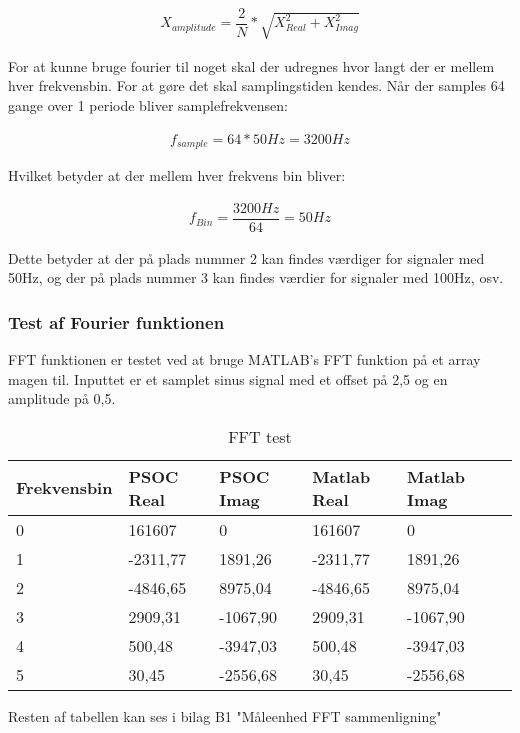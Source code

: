 \begin{align}
X_{amplitude} = \dfrac{2}{N}*\sqrt{X_{Real}^{2}+X_{Imag}^{2}}
\end{align} 	  


For at kunne bruge fourier til noget skal der udregnes hvor langt der er mellem hver frekvensbin. For at gøre det skal samplingstiden kendes. Når der samples 64 gange over 1 periode bliver samplefrekvensen:

\begin{align}
f_{sample} = 64 * 50Hz = 3200Hz
\end{align}   

Hvilket betyder at der mellem hver frekvens bin bliver:

\begin{align}
f_{Bin} = \dfrac{3200Hz}{64} = 50Hz
\end{align}

Dette betyder at der på plads nummer 2 kan findes værdiger for signaler med 50Hz, og der på plads nummer 3 kan findes værdier for signaler med 100Hz, osv.

\subsubsection{Test af Fourier funktionen}
FFT funktionen er testet ved at bruge MATLAB's FFT funktion på et array magen til. Inputtet er et samplet sinus signal med et offset på 2,5 og en amplitude på 0,5.

\begin{table}[H] 
	\centering 
	\begin{tabular}{|l|l|l|l|l|l|} %
		\hline 	%
		Frekvensbin &PSOC Real				& PSOC Imag 	&Matlab Real    	&Matlab Imag 	 \\ \hline 	
		0&161607		&0				&161607		&0 	 \\ \hline 
		1&-2311,77	&1891,26		&-2311,77	&1891,26	 \\ \hline
		2&-4846,65	&8975,04		&-4846,65	&8975,04	 \\ \hline
		3&2909,31 	&-1067,90		&2909,31 	&-1067,90	 \\ \hline 
		4&500,48 		&-3947,03		&500,48 	&-3947,03	 \\ \hline 
		5&30,45		&-2556,68		&30,45		&-2556,68 \\ \hline   
	\end{tabular} 
	\caption{FFT test} 
	\label{tab:fftTest} 
\end{table}
Resten af tabellen kan ses i bilag B1 "Måleenhed FFT sammenligning" 


